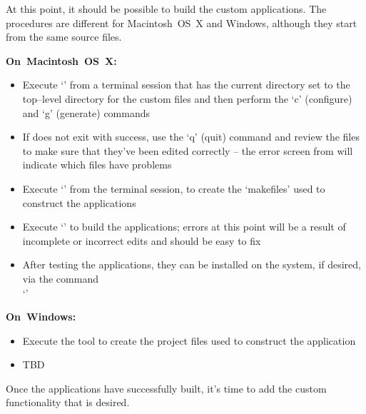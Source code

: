 \tertiaryEnd{}
At this point, it should be possible to build the custom applications.
The procedures are different for Macintosh~OS~X and Windows, although they start from the
same source files. 
\begin{center}\textbf{On~Macintosh~OS~X:}\end{center}
\begin{itemize}
\item Execute `' from a terminal session that has the current directory
set to the top--level directory for the custom files and then perform the `c' (configure)
and `g' (generate) commands
\item If  does not exit with success, use the `q' (quit) command and review
the  files to make sure that they've been edited correctly -- the
error screen from  will indicate which files have problems
\item Execute `' from the terminal session, to create the `makefiles' used
to construct the applications
\item Execute `' to build the applications; errors at this point will be a
result of incomplete or incorrect edits and should be easy to fix
\item After testing the applications, they can be installed on the system, if desired, via
the command\\
`'
\end{itemize}
\begin{center}\textbf{On~Windows:}\end{center}
\begin{itemize}
\item Execute the tool  to create the project files used to construct the
application
\item TBD
\end{itemize}
\tertiaryEnd{}
Once the applications have successfully built, it's time to add the custom functionality
that is desired.
